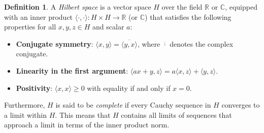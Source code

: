 \documentclass[12pt, reqno]{amsart}
\theoremstyle{definition}
\newtheorem{definition}[theorem]{Definition}
\numberwithin{equation}{section}
\begin{document}
    \begin{definition}
    A \textit{Hilbert space} is a vector space $H$ over the field $\mathbb{R}$ or $\mathbb{C}$, equipped with an inner product $\langle \cdot, \cdot \rangle : H \times H \to \mathbb{R}$ (or $\mathbb{C}$) that satisfies the following properties for all $x, y, z \in H$ and scalar $a$:

\begin{itemize}
    \item \textbf{Conjugate symmetry}: $\langle x, y \rangle = \overline{\langle y, x \rangle}$, where $\overline{\cdot}$ denotes the complex conjugate.
    \item \textbf{Linearity in the first argument}: $\langle ax + y, z \rangle = a\langle x, z \rangle + \langle y, z \rangle$.
    \item \textbf{Positivity}: $\langle x, x \rangle \geq 0$ with equality if and only if $x = 0$.
\end{itemize}
Furthermore, $H$ is said to be \textit{complete} if every Cauchy sequence in $H$ converges to a limit within $H$. This means that $H$ contains all limits of sequences that approach a limit in terms of the inner product norm.
    \end{definition}
\end{document}

